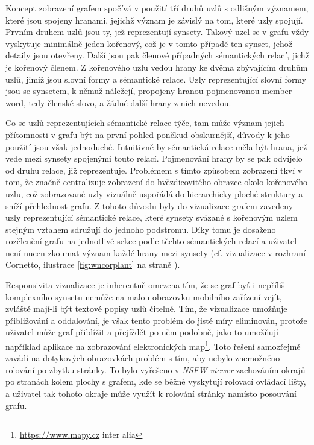 \documentclass[a4paper, 11pt, oneside]{book}
\newcommand{\simplywn}{\textit{NSFW viewer} }
\newcommand\ex{\textsf}
\begin{document}
				Koncept zobrazení grafem spočívá v použití tří druhů uzlů s odlišným významem, které jsou spojeny hranami, jejichž význam je závislý na tom, které uzly spojují. Prvním druhem uzlů jsou ty, jež reprezentují synsety. Takový uzel se v grafu vždy vyskytuje minimálně jeden kořenový, což je v tomto případě ten synset, jehož detaily jsou otevřeny. Další jsou pak členové případných sémantických relací, jichž je kořenový členem. Z kořenového uzlu vedou hrany ke dvěma zbývajícím druhům uzlů, jimiž jsou slovní formy a sémantické relace. Uzly reprezentující slovní formy jsou se synsetem, k němuž náležejí, propojeny hranou pojmenovanou \ex{member word}, tedy členské slovo, a žádné další hrany z nich nevedou. 

				Co se uzlů reprezentujících sémantické relace týče, tam může význam jejich přítomnosti v grafu být na první pohled poněkud obskurnější, důvody k jeho použití jsou však jednoduché. Intuitivně by sémantická relace měla být hrana, jež vede mezi synsety spojenými touto relací. Pojmenování hrany by se pak odvíjelo od druhu relace, již reprezentuje. Problémem s tímto způsobem zobrazení tkví v tom, že značně centralizuje zobrazení do hvězdicovitého obrazce okolo kořenového uzlu, což zobrazované uzly vizuálně uspořádá do hierarchicky ploché struktury a sníží přehlednost grafu. Z tohoto důvodu byly do vizualizace grafem zavedeny uzly reprezentující sémantické relace, které synsety svázané s kořenovým uzlem stejným vztahem sdružují do jednoho podstromu. Díky tomu je dosaženo rozčlenění grafu na jednotlivé sekce podle těchto sémantických relací a uživatel není nucen zkoumat význam každé hrany mezi synsety (cf. vizualizace v rozhraní Cornetto, ilustrace \ref{fig:wncorplant} na straně \pageref{fig:wncorplant}).

				Responsivita vizualizace je inherentně omezena tím, že se graf byť i nepříliš komplexního synsetu nemůže na malou obrazovku mobilního zařízení vejít, zvláště mají-li být textové popisy uzlů čitelné. Tím, že vizualizace umožňuje přibližování a oddalování, je však tento problém do jisté míry eliminován, protože uživatel může graf přiblížit a přejíždět po něm podobně, jako to umožňují například aplikace na zobrazování elektronických map\footnote{\url{https://www.mapy.cz} inter alia}. Toto řešení samozřejmě zavádí na dotykových obrazovkách problém s tím, aby nebylo znemožněno rolování po zbytku stránky. To bylo vyřešeno v \simplywn zachováním okrajů po stranách kolem plochy s grafem, kde se běžně vyskytují rolovací ovládací lišty, a uživatel tak tohoto okraje může využít k rolování stránky namísto posouvání grafu.
\end{document}
